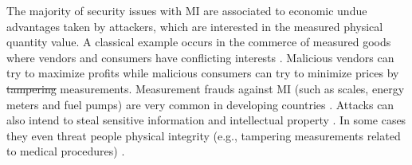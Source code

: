 \documentclass[journal]{IEEEtran} %
\providecommand{\DIFadd}[1]{{\protect\color{blue}\uwave{#1}}} %
\providecommand{\DIFdel}[1]{{\protect\color{red}\sout{#1}}}                      %
\providecommand{\DIFaddbegin}{} %
\providecommand{\DIFaddend}{} %
\providecommand{\DIFdelbegin}{} %
\providecommand{\DIFdelend}{} %
\begin{document}
The majority of security issues with MI are associated to economic undue advantages taken by attackers, which are interested in the measured physical quantity value. A classical example occurs in the commerce of measured goods where vendors and consumers have conflicting interests \cite{RodriguesFilho2015}. Malicious vendors can try to maximize profits while malicious consumers can try to minimize prices by \DIFdelbegin \DIFdel{tampering }\DIFdelend \DIFaddbegin \DIFadd{frauding }\DIFaddend measurements. Measurement frauds against MI (such as scales, energy meters and fuel pumps) are very common in developing countries \cite{Camara2012,Luchsinger2008}. Attacks can also intend to steal sensitive information and intellectual property \cite{Camara2012,Oppermann2016}. In some cases they even threat people physical integrity (e.g., tampering measurements related to medical procedures) \cite{Boccardo2014}.
\end{document}
